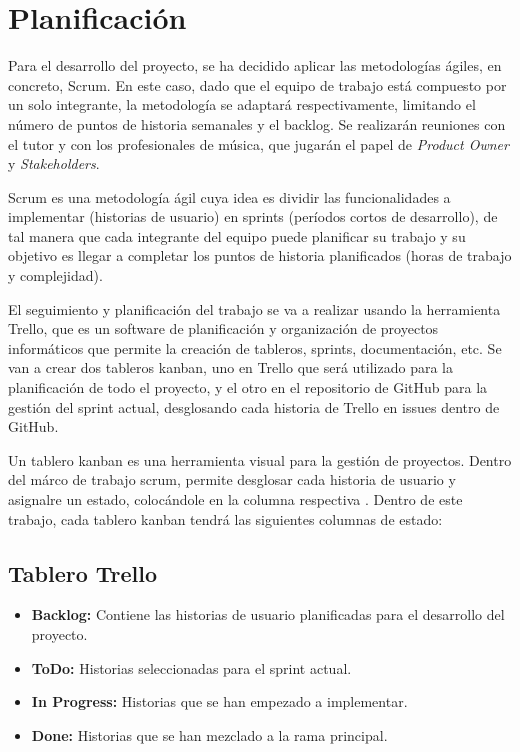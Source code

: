 \section{Planificación}
Para el desarrollo del proyecto, se ha decidido aplicar las metodologías ágiles, en concreto, Scrum. En este caso, dado que el equipo de trabajo está compuesto por un solo integrante, la metodología se adaptará respectivamente, limitando el número de puntos de historia semanales y el backlog. Se realizarán reuniones con el tutor y con los profesionales de música, que jugarán el papel de \textit{Product Owner} y \textit{Stakeholders}. 
\par Scrum es una metodología ágil cuya idea es dividir las funcionalidades a implementar (historias de usuario) en sprints (períodos cortos de desarrollo), de tal manera que cada integrante del equipo puede planificar su trabajo y su objetivo es llegar a completar los puntos de historia planificados (horas de trabajo y complejidad). \citep{scrum}
\par El seguimiento y planificación del trabajo se va a realizar usando la herramienta Trello, que es un software de planificación y organización de proyectos informáticos que permite la creación de tableros, sprints, documentación, etc. Se van a crear dos tableros kanban, uno en Trello que será utilizado para la planificación de todo el proyecto, y el otro en el repositorio de GitHub para la gestión del sprint actual, desglosando cada historia de Trello en issues dentro de GitHub.
\par Un tablero kanban es una herramienta visual para la gestión de proyectos. Dentro del márco de trabajo scrum, permite desglosar cada historia de usuario y asignalre un estado, colocándole en la columna respectiva \citep{kanban}. Dentro de este trabajo, cada tablero kanban tendrá las siguientes columnas de estado:
\subsection{Tablero Trello}
\begin{itemize}
	\item \textbf{Backlog:} Contiene las historias de usuario planificadas para el desarrollo del proyecto.
	\item \textbf{ToDo:} Historias seleccionadas para el sprint actual.
	\item \textbf{In Progress:} Historias que se han empezado a implementar.
	\item \textbf{Done:} Historias que se han mezclado a la rama principal.
\end{itemize}
